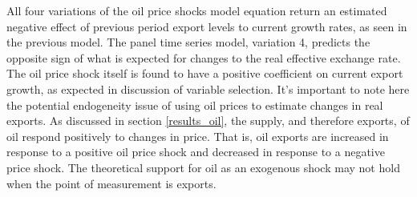\documentclass[10pt,letterpaper,pdftex]{article}
\begin{document}
All four variations of the oil price shocks model equation return an estimated negative effect of previous period export levels to current growth rates, as seen in the previous model. The panel time series model, variation 4, predicts the opposite sign of what is expected for changes to the real effective exchange rate. The oil price shock itself is found to have a positive coefficient on current export growth, as expected in discussion of variable selection. It's important to note here the potential endogeneity issue of using oil prices to estimate changes in real exports. As discussed in section \ref{results_oil}, the supply, and therefore exports, of oil respond positively to changes in price. That is, oil exports are increased in response to a positive oil price shock and decreased in response to a negative price shock. The theoretical support for oil as an exogenous shock may not hold when the point of measurement is exports. 
\end{document}
